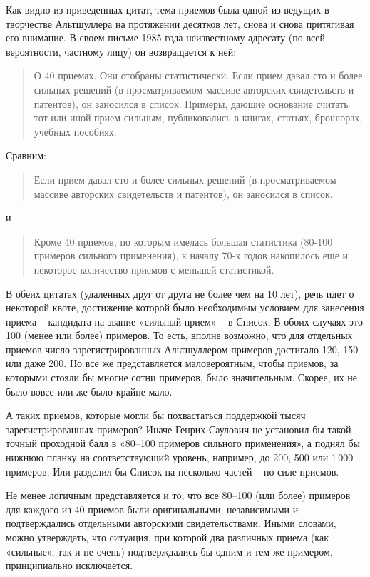 \documentclass[11pt,a4paper]{article}
\begin{document}
Как видно из приведенных цитат, тема приемов была одной из ведущих в
творчестве Альтшуллера на протяжении десятков лет, снова и снова притягивая
его внимание. В своем письме 1985 года неизвестному адресату (по всей
вероятности, частному лицу) он возвращается к ней:
\begin{quote}
  О 40 приемах. Они отобраны статистически. Если прием давал сто и более
  сильных решений (в просматриваемом массиве авторских свидетельств и
  патентов), он заносился в список. Примеры, дающие основание считать тот или
  иной прием сильным, публиковались в книгах, статьях, брошюрах, учебных
  пособиях.  \cite{Altshuller1985}
\end{quote}
Сравним:
\begin{quote}
  Если прием давал сто и более сильных решений (в просматриваемом массиве
  авторских свидетельств и патентов), он заносился в список.
\end{quote}
и
\begin{quote}
  Кроме 40 приемов, по которым имелась большая статистика (80-100 примеров
  сильного применения), к началу 70-х годов накопилось еще и некоторое
  количество приемов с меньшей статистикой.
\end{quote}
В обеих цитатах (удаленных друг от друга не более чем на 10 лет), речь идет о
некоторой квоте, достижение которой было необходимым условием для занесения
приема -- кандидата на звание «сильный прием» -- в Список. В обоих случаях это
100 (менее или более) примеров. То есть, вполне возможно, что для отдельных
приемов число зарегистрированных Альтшуллером примеров достигало 120, 150 или
даже 200. Но все же представляется маловероятным, чтобы приемов, за которыми
стояли бы многие сотни примеров, было значительным. Скорее, их не было вовсе
или же было крайне мало.

А таких приемов, которые могли бы похвастаться поддержкой тысяч
зарегистрированных примеров? Иначе Генрих Саулович не установил бы такой
точный проходной балл в «80--100 примеров сильного применения», а поднял бы
нижнюю планку на соответствующий уровень, например, до 200, 500 или 1\,000
примеров. Или разделил бы Список на несколько частей -- по силе приемов.

Не менее логичным представляется и то, что все 80--100 (или более) примеров для
каждого из 40 приемов были оригинальными, независимыми и подтверждались
отдельными авторскими свидетельствами. Иными словами, можно утверждать, что
ситуация, при которой два различных приема (как «сильные», так и не очень)
подтверждались бы одним и тем же примером, принципиально исключается.
\end{document}
